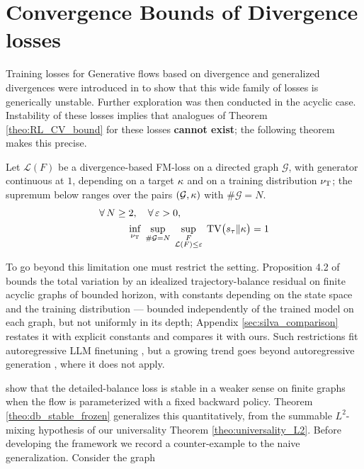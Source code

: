 \section{Convergence Bounds of Divergence losses}\label{sec:cv_divergence}

Training losses for Generative flows based on divergence and generalized divergences were introduced in \cite{brunswic2024theory} to show that this wide family of losses is generically unstable.
Further exploration was then conducted \cite{hu2024beyond,silva2024divergence} in the acyclic case. 
Instability of these losses implies that analogues of Theorem \ref{theo:RL_CV_bound} for these losses \textbf{cannot exist}; the following theorem makes this precise.

\begin{theorem}\label{theo:no_bound_divergence}
    Let $\mathcal L(F)$ be a divergence-based FM-loss on a directed graph $\mathcal G$, with
    generator continuous at $1$, depending on a target $\kappa$ and on a training distribution $\nu_{\mathrm{T}}$; the supremum below ranges over the pairs $(\mathcal G,\kappa)$ with $\#\mathcal G = N$.
\begin{align*}
    &\forall\, N\geq 2,\quad \forall\, \varepsilon > 0, \\
    &\hspace{1cm}
    \inf_{\nu_{\mathrm{T}}}\; \sup_{\#\mathcal G = N}\; \sup_{\substack{
      F \\ \mathcal L(F) \leq \varepsilon
    }} \; \mathrm{TV}\bigl(s_\tau \| \kappa\bigr) = 1
\end{align*}
\end{theorem}

To go beyond this limitation one must restrict the setting. Proposition 4.2 of
\citet{silvageneralization} bounds the total variation by an idealized trajectory-balance
residual on finite acyclic graphs of bounded horizon, with constants depending on the state
space and the training distribution --- bounded independently of the trained model on each
graph, but not uniformly in its depth; Appendix
\ref{sec:silva_comparison} restates it with explicit constants and compares it with ours. Such
restrictions fit autoregressive LLM finetuning
\cite{bartoldson2025trajectory,yu2024flow,wang2025gflowgr,ho2024proof,takase2024gflownet},
but a growing trend goes beyond autoregressive generation
\cite{zhu2025llada,nie2025large,sahoo2024simple,cetin2025large,von2025generalized}, where it
does not apply.

\citet{morozov2025revisiting} show that the detailed-balance loss is stable in a weaker sense
on finite graphs when the flow is parameterized with a fixed backward policy. Theorem
\ref{theo:db_stable_frozen} generalizes this quantitatively, from the summable $L^2$-mixing
hypothesis of our universality Theorem \ref{theo:universality_L2}. Before developing the
framework we record a counter-example to the naive generalization. Consider the graph


